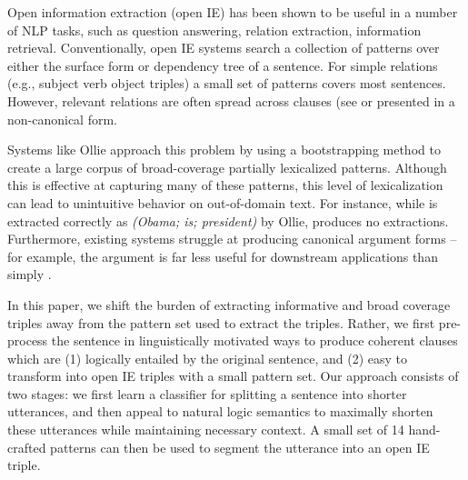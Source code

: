 Open information extraction (open IE) has been shown to be useful in a
  number of NLP tasks, such as question answering,
  relation extraction, information retrieval.
Conventionally, open IE systems search a collection of patterns over either
  the surface form or dependency tree of a sentence.
For simple relations (e.g., subject verb object triples) a small set of
  patterns covers most sentences.
However, relevant relations are often spread across clauses (see
   or presented in a non-canonical form.

Systems like Ollie \cite{key:2012mausam-ollie} approach this problem by 
  using a bootstrapping method to create a large corpus of broad-coverage
  partially lexicalized patterns.
Although this is effective at capturing many of these patterns,
  this level of lexicalization can lead to unintuitive behavior on 
  out-of-domain text.
For instance, while  is extracted correctly 
  as \textit{(Obama; is; president)} by Ollie,
   produces no extractions.
Furthermore, existing systems struggle at producing
  canonical argument forms -- for example, the argument
   is far less useful for downstream
  applications than simply .

In this paper, we shift the burden of extracting informative and broad
  coverage triples away from the pattern set used to extract the triples.
Rather, we first pre-process the sentence in linguistically motivated ways
  to produce coherent clauses which are (1) logically entailed by the 
  original sentence, and (2) easy to transform into open IE triples 
  with a small pattern set.
Our approach consists of two stages:
  we first learn a classifier for splitting a sentence into shorter
  utterances, and then appeal to natural logic semantics to maximally
  shorten these utterances while maintaining necessary context.
A small set of 14 hand-crafted patterns can then be used to segment the
  utterance into an open IE triple.

